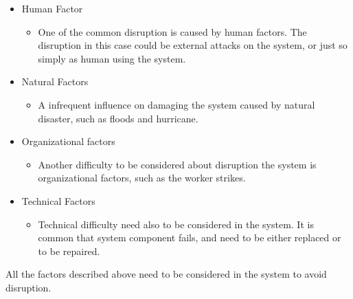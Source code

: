 \begin{itemize}
	\item Human Factor
	\begin{itemize}
		\item One of the common disruption is caused by human factors. The disruption in this case could be external attacks on the system, or just so simply as human using the system.  
	\end{itemize}
	\item Natural Factors
	\begin{itemize}
		\item A infrequent influence on damaging the system caused by natural disaster, such as floods and hurricane. 
	\end{itemize}
	\item Organizational factors
	\begin{itemize}
		\item Another difficulty to be considered about disruption the system is organizational factors, such as the worker strikes.   
	\end{itemize}
	\item Technical Factors
	\begin{itemize}
		\item Technical difficulty need also to be considered in the system. It is common that system component fails, and need to be either replaced or to be repaired.   
	\end{itemize}	
\end{itemize}

All the factors described above need to be considered in the system to avoid disruption. 




